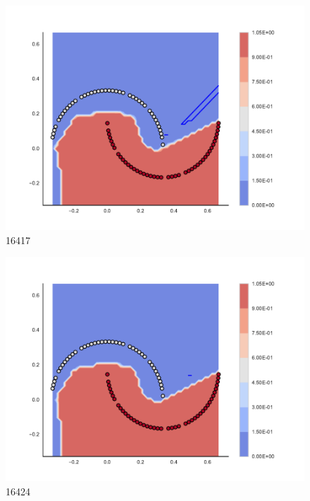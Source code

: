 \begin{subfigure}[b]{0.09\textwidth}
    \includegraphics[clip, trim=2.35cm 1.75cm 4.5cm 0cm,width=\textwidth]{img/convergence/16417.pdf}
    \caption{16417}
    \label{fig:convergence_16417}
\end{subfigure}
%
\begin{subfigure}[b]{0.09\textwidth}
    \includegraphics[clip, trim=2.35cm 1.75cm 4.5cm 0cm,width=\textwidth]{img/convergence/16424.pdf}
    \caption{16424}
    \label{fig:convergence_16424}
\end{subfigure}
%
